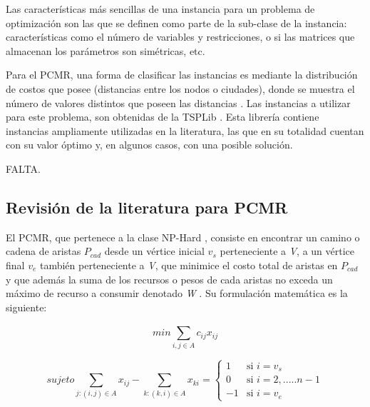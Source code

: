 Las características más sencillas de una instancia para un problema de optimización son las que se definen como parte de la sub-clase de la instancia: características como el número de variables y restricciones, o si las matrices que almacenan los parámetros son simétricas, etc.

Para el PCMR, una forma de clasificar las instancias es mediante la distribución de costos que posee (distancias entre los nodos o ciudades), donde se muestra el número de valores distintos que poseen las distancias \citep{smith_2012}. Las instancias a utilizar para este problema, son obtenidas de la TSPLib \citep{reinelt_1991}. Esta librería contiene instancias ampliamente utilizadas en la literatura, las que en su totalidad cuentan con su valor óptimo y, en algunos casos, con una posible solución.

FALTA.

\subsection{Revisión de la literatura para PCMR}

El PCMR, que pertenece a la clase NP-Hard \citep{joksch1966shortest}, consiste en encontrar un camino o cadena de aristas $P_{cad}$ desde un vértice inicial $v_s$ perteneciente a \emph{V}, a un vértice final $v_e$ también perteneciente a \emph{V}, que minimice el costo total de aristas en $P_{cad}$ y que además la suma de los recursos o pesos de cada aristas no exceda un máximo de recurso a consumir denotado \emph{W} \citep{dumitrescu2001algorithms}. Su formulación matemática es la siguiente:


\begin{equation}
min \sum_{i,j \in A}^{}{c_{ij}x_{ij}}
\end{equation}

\begin{equation}
sujeto  \sum_{j:(i,j) \in A }^{}{x_{ij}} - \sum_{k:(k,i) \in A}^{}{x_{ki}} = \begin{cases}
      1              & \mbox{si } i= v_s   \\
      0 			 & \mbox{si } i= 2,..... n-1 \\
      -1 			 & \mbox{si } i= v_e
   \end{cases}
\end{equation}

